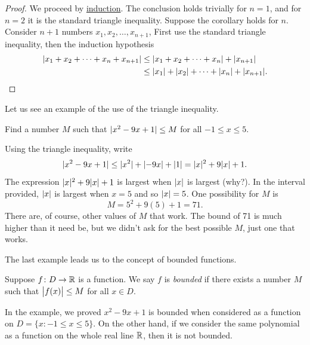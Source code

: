 \begin{proof}
We proceed by \hyperref[induction:thm]{induction}.
The conclusion holds trivially for $n=1$, and
for $n=2$ it is the standard triangle inequality.  Suppose the corollary
holds for $n$.  Consider $n+1$ numbers $x_1,x_2,\ldots,x_{n+1}$,
First use the standard triangle inequality, then the induction
hypothesis
\begin{equation*}
\begin{split}
\lvert {x_1 + x_2 + \cdots + x_n + x_{n+1}} \rvert & \leq
\lvert {x_1 + x_2 + \cdots + x_n} \rvert + \lvert {x_{n+1}} \rvert \\
& \leq
\lvert {x_1} \rvert + \lvert {x_2} \rvert + \cdots + \lvert {x_n} \rvert + \lvert {x_{n+1}} \rvert .  \qedhere
\end{split}
\end{equation*}
\end{proof}

Let us see an example of the use of the triangle inequality.

\begin{example}
Find a number $M$ such that $\lvert {x^2-9x+1} \rvert \leq M$ for all $-1 \leq x \leq
5$.

Using the triangle inequality, write
\begin{equation*}
\lvert {x^2-9x+1} \rvert \leq \lvert {x^2} \rvert+\lvert {-9x} \rvert+\lvert {1} \rvert
=
\lvert {x} \rvert^2+9\lvert {x} \rvert+1 .
\end{equation*}
The expression
$\lvert {x} \rvert^2+9\lvert {x} \rvert+1$ is largest when $\lvert {x} \rvert$ is largest (why?).  In the interval
provided, $\lvert {x} \rvert$ is largest when $x=5$ and so $\lvert {x} \rvert=5$.  One
possibility for $M$ is
\begin{equation*}
M = 5^2+9(5)+1 = 71 .
\end{equation*}
There are, of course, other values of $M$ that work.  The bound of 71
is much higher than it
need be, but we didn't ask for the best possible $M$, just one that works.
\end{example}

The last example leads us to the concept of bounded functions.

\begin{defn}
Suppose $f \colon D \to {\mathbb{R}}$ is a function.  We say $f$ is
\emph{bounded}
if there exists a number $M$
such that $\bigl\lvert {f(x)} \bigr\rvert \leq M$ for all $x \in D$.
\end{defn}

In the example, we proved $x^2-9x+1$ is bounded when considered as a
function on $D = \{ x : -1 \leq x \leq 5 \}$.  On the other hand,
if we consider the same polynomial as a function on the whole real line ${\mathbb{R}}$,
then it is not bounded.

